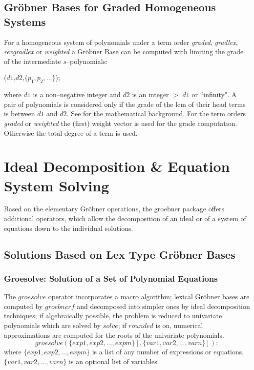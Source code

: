 \subsection{Gr\"obner Bases for Graded Homogeneous Systems}

For a homogeneous system of polynomials under a term order
{\it graded}, {\it gradlex}, {\it revgradlex} or {\it weighted}
a Gr\"obner Base can be computed with limiting the grade
of the intermediate $s$--polynomials:
\begin{description}
\item [{\it dd\_groebner}]($d1$,$d2$,$\{p_1,p_2,\ldots\}$);
\end{description}
where $d1$ is a non--negative integer and $d2$ is an integer
$>$ $d1$ or ``infinity". A pair of polynomials is considered
only if the grade of the lcm of their head terms is between
$d1$ and $d2$. See \cite{BeWei:93} for the mathematical background.
For the term orders {\it graded} or {\it weighted} the (first) weight
vector is used for the grade computation. Otherwise the total
degree of a term is used.

\section{Ideal Decomposition \& Equation System Solving}
Based on the elementary Gr\"obner operations, the groebner package offers
additional operators, which allow the decomposition of an ideal or of a
system of equations down to the individual solutions.

\subsection{Solutions Based on Lex Type Gr\"obner Bases}

\subsubsection{Groesolve: Solution of a Set of Polynomial Equations}
 
The $groesolve$ operator incorporates a macro algorithm;
lexical Gr\"obner bases are computed by $groebnerf$ and decomposed
into simpler ones by ideal decomposition techniques; if algebraically
possible, the problem is reduced to univariate polynomials which are
solved by $solve$; if $rounded$ is on, numerical approximations are
computed for the roots of the univariate polynomials.
\[
 groesolve(\{exp1, exp2, \ldots , expm\}[,\{var1, var2, \ldots ,
varn\}]); \]
where $\{exp1, exp2,\ldots , expm\}$ is a list of any number of
expressions or equations, $\{var1, var2, \ldots , varn\}$ is an
optional list of variables.

